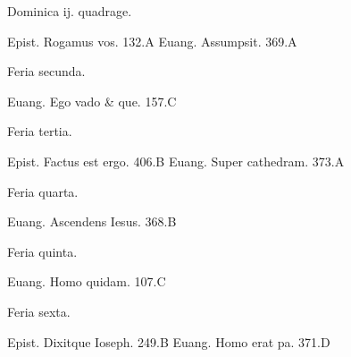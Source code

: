 \documentclass[a5paper,10pt]{book}
\begin{document}
\begin{multicols}{2}
\begin{center}
\color{red} Dominica ij. quadrage.
\end{center}
\vspace{-.75em}
\par \noindent Epist. Rogamus vos. \hfill 132.A
\newline Euang. Assumpsit. \hfill 369.A
\newline \vspace{-1.75em}
\begin{center}
\color{red} Feria secunda.
\end{center}
\vspace{-.75em}
\par \noindent Euang. Ego vado \& que. \hfill 157.C
\newline \vspace{-1.75em}
\begin{center}
\color{red} Feria tertia.
\end{center}
\vspace{-.75em}
\par \noindent Epist. Factus est ergo. \hfill 406.B
\newline Euang. Super cathedram. \hfill 373.A
\newline \vspace{-1.75em}
\begin{center}
\color{red} Feria quarta.
\end{center}
\vspace{-.75em}
\par \noindent Euang. Ascendens Iesus. \hfill 368.B
\newline \vspace{-1.75em}
\begin{center}
\color{red} Feria quinta.
\end{center}
\vspace{-.75em}
\par \noindent Euang. Homo quidam. \hfill 107.C
\newline \vspace{-1.75em}
\begin{center}
\color{red} Feria sexta.
\end{center}
\vspace{-.75em}
\par \noindent Epist. Dixitque Ioseph. \hfill 249.B
\newline Euang. Homo erat pa. \hfill 371.D
\newline \vspace{-1.75em}
\begin{center}

\end{center}
\end{multicols}
\end{document}
